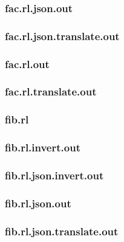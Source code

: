 \subsubsection{fac.rl.json.out}
\label{app:fac_rl.json.out}

\subsubsection{fac.rl.json.translate.out}
\label{app:fac_rl.json.translate.out}

\subsubsection{fac.rl.out}
\label{app:fac_rl.out}

\subsubsection{fac.rl.translate.out}
\label{app:fac_rl.translate.out}

\subsubsection{fib.rl}
\label{app:fib_rl}

\subsubsection{fib.rl.invert.out}
\label{app:fib_rl.invert.out}

\subsubsection{fib.rl.json.invert.out}
\label{app:fib_rl.json.invert.out}

\subsubsection{fib.rl.json.out}
\label{app:fib_rl.json.out}

\subsubsection{fib.rl.json.translate.out}
\label{app:fib_rl.json.translate.out}

